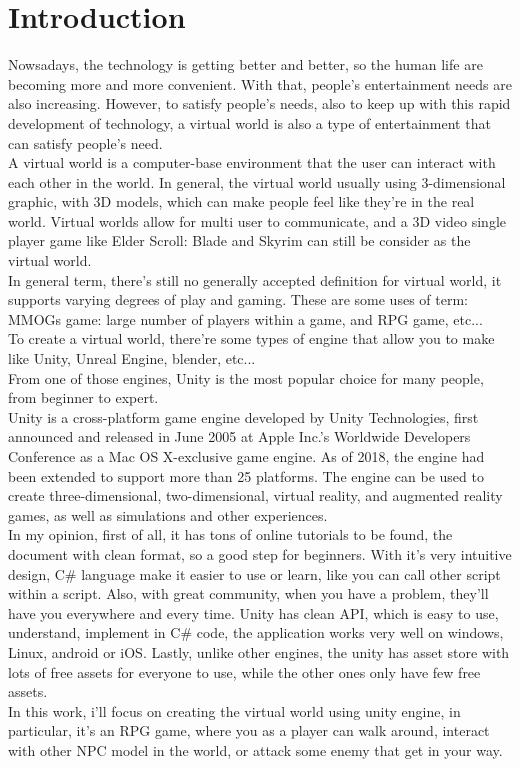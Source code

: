 \documentclass[a4paper, 13pt]{extarticle}
\begin{document}
\section{\Large Introduction} 
Nowsadays, the technology is getting better and better, so the human life are becoming more and more convenient. With that, people's entertainment needs are also increasing. However, to satisfy people's needs, also to keep up with this rapid development of technology, a virtual world is also a type of entertainment that can satisfy people's need. \\[0.35cm]  A virtual world is a computer-base environment that the user can interact with each other in the world. In general, the virtual world usually using 3-dimensional graphic, with 3D models, which can make people feel like they're in the real world. Virtual worlds allow for multi user to communicate, and a 3D video single player game like Elder Scroll: Blade and Skyrim can still be consider as the virtual world. \\[0.35cm] In general term, there's still no generally accepted definition for virtual world, it supports varying degrees of play and gaming. These are some uses of term: MMOGs game: large number of players within a game, and RPG game, etc... \\[0.35cm] To create a virtual world, there're some types of engine that allow you to make like Unity, Unreal Engine, blender, etc... \\[0.35cm] From one of those engines, Unity is the most popular choice for many people, from beginner to expert. \\[0.35cm] Unity is a cross-platform game engine developed by Unity Technologies, first announced and released in June 2005 at Apple Inc.'s Worldwide Developers Conference as a Mac OS X-exclusive game engine. As of 2018, the engine had been extended to support more than 25 platforms. The engine can be used to create three-dimensional, two-dimensional, virtual reality, and augmented reality games, as well as simulations and other experiences. \\[0.35cm]
 In my opinion, first of all, it has tons of online tutorials to be found, the document with clean format, so a good step for beginners. With it's very intuitive design, C\# language make it easier to use or learn, like you can call other script within a script. Also, with great community, when you have a problem, they'll have you everywhere and every time. Unity has clean API, which is easy to use, understand, implement in C\# code, the application works very well on windows, Linux, android or iOS. Lastly, unlike other engines, the unity has asset store with lots of free assets for everyone to use, while the other ones only have few free assets. \\[0.35cm]In this work, i'll focus on creating the virtual world using unity engine, in particular, it's an RPG game, where you as a player can walk around, interact with other NPC model in the world, or attack some enemy that get in your way. 
  
\end{document}
